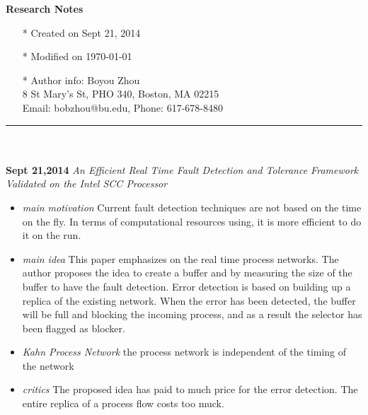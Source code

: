 \documentclass[]{article}
\begin{document}
\pagestyle{empty}
{\large\textbf{Research Notes}}
\begin{itemize}
    \item[*] Created on Sept 21, 2014
    \item[*] Modified on \today
    \item[*] Author info: Boyou Zhou\\
             8 St Mary's St, PHO 340, Boston, MA 02215\\
             Email: bobzhou@bu.edu, Phone: 617-678-8480
\end{itemize}


\rule[-0.1cm]{7.5in}{0.01cm}\\
\\
\noindent \textbf{Sept 21,2014}
\textit{An Efficient Real Time Fault Detection and Tolerance Framework Validated on the Intel SCC Processor}
\indent		\begin{itemize}
            \item \textit{main motivation} Current fault detection techniques are not based on the time on the fly.
            In terms of computational resources using, it is more efficient to do it on the run. 

            \item \textit{main idea} This paper emphasizes on the real time process networks. The author proposes the
            idea to create a buffer and by measuring the size of the buffer to have the fault detection.
            Error detection is based on building up a replica of the existing network.
            When the error has been detected, the buffer will be full and blocking the incoming process, and as a result
            the selector has been flagged as blocker.

            \item \textit{Kahn Process Network} the process network is independent of the timing of the network

            \item \textit{critics} The proposed idea has paid to much price for the error detection. The entire replica
            of a process flow costs too muck.

        \end{itemize}
\end{document}
